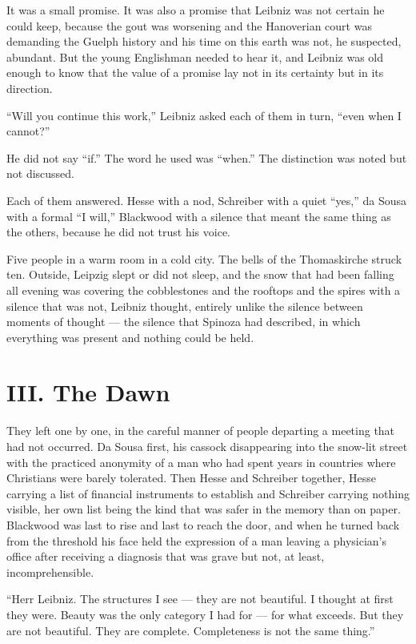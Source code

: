 It was a small promise. It was also a promise that Leibniz was not certain he could keep, because the gout was worsening and the Hanoverian court was demanding the Guelph history and his time on this earth was not, he suspected, abundant. But the young Englishman needed to hear it, and Leibniz was old enough to know that the value of a promise lay not in its certainty but in its direction.

``Will you continue this work,'' Leibniz asked each of them in turn, ``even when I cannot?''

He did not say ``if.'' The word he used was ``when.'' The distinction was noted but not discussed.

Each of them answered. Hesse with a nod, Schreiber with a quiet ``yes,'' da Sousa with a formal ``I will,'' Blackwood with a silence that meant the same thing as the others, because he did not trust his voice.

Five people in a warm room in a cold city. The bells of the Thomaskirche struck ten. Outside, Leipzig slept or did not sleep, and the snow that had been falling all evening was covering the cobblestones and the rooftops and the spires with a silence that was not, Leibniz thought, entirely unlike the silence between moments of thought --- the silence that Spinoza had described, in which everything was present and nothing could be held.


\section*{III. The Dawn}

They left one by one, in the careful manner of people departing a meeting that had not occurred. Da Sousa first, his cassock disappearing into the snow-lit street with the practiced anonymity of a man who had spent years in countries where Christians were barely tolerated. Then Hesse and Schreiber together, Hesse carrying a list of financial instruments to establish and Schreiber carrying nothing visible, her own list being the kind that was safer in the memory than on paper. Blackwood was last to rise and last to reach the door, and when he turned back from the threshold his face held the expression of a man leaving a physician's office after receiving a diagnosis that was grave but not, at least, incomprehensible.

``Herr Leibniz. The structures I see --- they are not beautiful. I thought at first they were. Beauty was the only category I had for --- for what exceeds. But they are not beautiful. They are complete. Completeness is not the same thing.''

